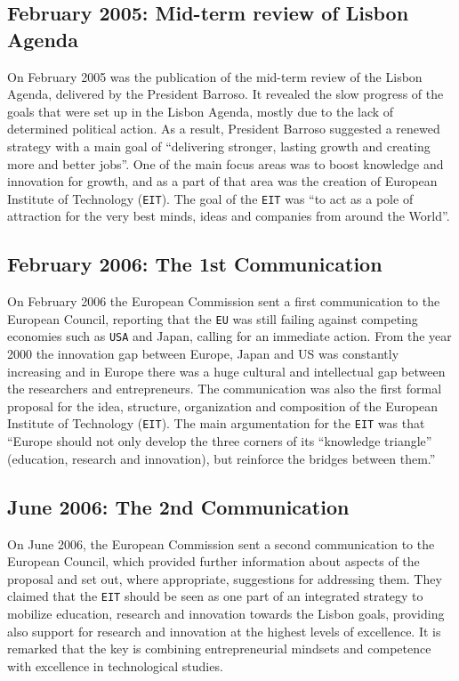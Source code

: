 \documentclass[11pt,a4paper,oneside,twocolumn]{IEEEtran}
\begin{document}
\subsection{February 2005: Mid-term review of Lisbon Agenda}
On February 2005 was the publication of the mid-term review of the Lisbon Agenda, delivered by the President Barroso.
It revealed the slow progress of the goals that were set up in the Lisbon Agenda, mostly due to the lack of determined political action\cite{3_2}.
As a result, President Barroso suggested a renewed strategy with a main goal of ``delivering stronger, lasting growth and creating more and better jobs''\cite{3_3}.
One of the main focus areas was to boost knowledge and innovation for growth, and as a part of that area was the creation of European Institute of Technology (\texttt{EIT})\cite{3_3}.
The goal of the \texttt{EIT} was ``to act as a pole of attraction for the very best minds, ideas and companies from around the World''\cite{3_3}.

\subsection{February 2006: The 1st Communication}
On February 2006 the European Commission sent a first communication to the European Council, reporting that the \texttt{EU} was still failing against competing economies such as \texttt{USA} and Japan, calling for an immediate action. From the year 2000 the innovation gap between Europe, Japan and US was constantly increasing and in Europe there was a huge cultural and intellectual gap between the researchers and entrepreneurs\cite{5_4}.
The communication was also the first formal proposal for the idea, structure, organization and composition of the European Institute of Technology (\texttt{EIT}). The main argumentation for the \texttt{EIT} was that ``Europe should not only develop the three corners of its ``knowledge triangle'' (education, research and innovation), but reinforce the bridges between them.''\cite{5_4}

\subsection{June 2006: The 2nd Communication}
On June 2006, the European Commission sent a second communication to the European Council, which provided further information about aspects of the proposal and set out, where appropriate, suggestions for addressing them. They claimed that the \texttt{EIT} should be seen as one part of an integrated strategy to mobilize education, research and innovation towards the Lisbon goals, providing also support for research and innovation at the highest levels of excellence. It is remarked that the key is combining entrepreneurial mindsets and competence with excellence in technological studies\cite{3_5}.
\end{document}
